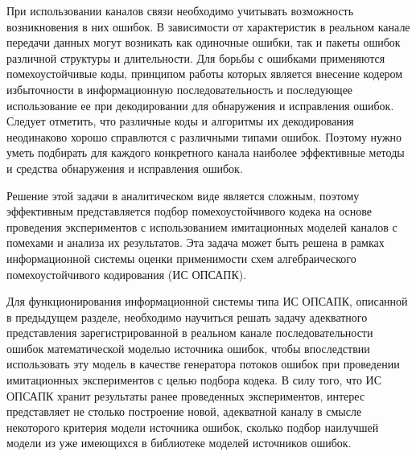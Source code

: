 \documentclass[twoside,12pt]{article}
\begin{document}

При использовании каналов связи необходимо учитывать возможность возникновения в них ошибок. В зависимости от характеристик в реальном канале передачи данных могут возникать как одиночные ошибки, так и пакеты ошибок различной структуры и длительности. Для борьбы с ошибками применяются помехоустойчивые коды, принципом работы которых является внесение кодером избыточности в информационную последовательность и последующее использование ее при декодировании для обнаружения и исправления ошибок. Следует отметить, что различные коды и алгоритмы их декодирования неодинаково хорошо справлются с различными типами ошибок. Поэтому нужно уметь подбирать для каждого конкретного канала наиболее эффективные методы и средства обнаружения и исправления ошибок.

Решение этой задачи в аналитическом виде является сложным, поэтому эффективным представляется подбор помехоустойчивого кодека на основе проведения экспериментов с использованием имитационных моделей каналов с помехами и анализа их результатов. Эта задача может быть решена в рамках информационной системы оценки применимости схем алгебраического помехоустойчивого кодирования (ИС ОПСАПК).

%

Для функционирования информационной системы типа ИС ОПСАПК, описанной в предыдущем разделе, необходимо научиться решать задачу адекватного представления зарегистрированной в реальном канале последовательности ошибок математической моделью источника ошибок, чтобы впоследствии использовать эту модель в качестве генератора потоков ошибок при проведении имитационных экспериментов с целью подбора кодека. В силу того, что ИС ОПСАПК хранит результаты ранее проведенных экспериментов, интерес представляет не столько построение новой, адекватной каналу в смысле некоторого критерия модели источника ошибок, сколько подбор наилучшей модели из уже имеющихся в библиотеке моделей источников ошибок.
\end{document}
